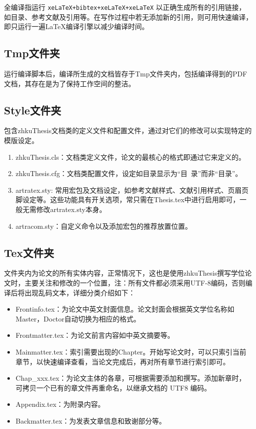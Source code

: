 {全编译指运行 \verb|xeLaTeX+bibtex+xeLaTeX+xeLaTeX| 以正确生成所有的引用链接，如目录、参考文献及引用等。在写作过程中若无添加新的引用，则可用快速编译，即只运行一遍LaTeX编译引擎以减少编译时间。

\subsection{Tmp文件夹}

运行编译脚本后，编译所生成的文档皆存于Tmp文件夹内，包括编译得到的PDF文档，其存在是为了保持工作空间的整洁。

\subsection{Style文件夹}

包含zhkuThesis文档类的定义文件和配置文件，通过对它们的修改可以实现特定的模版设定。

\begin{enumerate}
    \item zhkuThesis.cls：文档类定义文件，论文的最核心的格式即通过它来定义的。
    \item zhkuThesis.cfg：文档类配置文件，设定如目录显示为“目~录”而非“目录”。
    \item artratex.sty: 常用宏包及文档设定，如参考文献样式、文献引用样式、页眉页脚设定等。这些功能具有开关选项，常只需在Thesis.tex中进行启用即可，一般无需修改artratex.sty本身。
    \item artracom.sty：自定义命令以及添加宏包的推荐放置位置。
\end{enumerate}

\subsection{Tex文件夹}

文件夹内为论文的所有实体内容，正常情况下，这也是使用zhkuThesis撰写学位论文时，主要关注和修改的一个位置，注：所有文件都必须采用UTF-8编码，否则编译后将出现乱码文本，详细分类介绍如下：

\begin{itemize}
    \item Frontinfo.tex：为论文中英文封面信息。论文封面会根据英文学位名称如Master，Doctor自动切换为相应的格式。
    \item Frontmatter.tex：为论文前言内容如中英文摘要等。
    \item Mainmatter.tex：索引需要出现的Chapter。开始写论文时，可以只索引当前章节，以快速编译查看，当论文完成后，再对所有章节进行索引即可。
    \item Chap{\_}xxx.tex：为论文主体的各章，可根据需要添加和撰写。添加新章时，可拷贝一个已有的章文件再重命名，以继承文档的 UTF8 编码。
    \item Appendix.tex：为附录内容。
    \item Backmatter.tex：为发表文章信息和致谢部分等。
\end{itemize}

}
